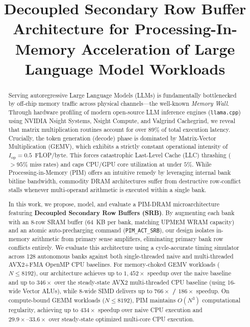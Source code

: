 \documentclass[conference]{IEEEtran}
\begin{document}
\title{Decoupled Secondary Row Buffer Architecture for Processing-In-Memory Acceleration of Large Language Model Workloads}

\author{
}

\maketitle

\begin{abstract}
Serving autoregressive Large Language Models (LLMs) is fundamentally bottlenecked by off-chip memory traffic across physical channels---the well-known \textit{Memory Wall}. Through hardware profiling of modern open-source LLM inference engines (\texttt{llama.cpp}) using NVIDIA Nsight Systems, Nsight Compute, and Valgrind Cachegrind, we reveal that matrix multiplication routines account for over $89\%$ of total execution latency. Crucially, the token generation (decode) phase is dominated by Matrix-Vector Multiplication (GEMV), which exhibits a strictly constant operational intensity of $I_{\text{op}} = 0.5$~FLOP/byte. This forces catastrophic Last-Level Cache (LLC) thrashing ($>95\%$ miss rates) and caps CPU/GPU core utilization at under $5\%$. While Processing-in-Memory (PIM) offers an intuitive remedy by leveraging internal bank bitline bandwidth, commodity DRAM architectures suffer from destructive row-conflict stalls whenever multi-operand arithmetic is executed within a single bank. 

In this work, we propose, model, and evaluate a PIM-DRAM microarchitecture featuring \textbf{Decoupled Secondary Row Buffers (SRB)}. By augmenting each bank with an 8-row SRAM buffer ($64$~KB per bank, matching UPMEM WRAM capacity) and an atomic auto-precharging command (\texttt{PIM\_ACT\_SRB}), our design isolates in-memory arithmetic from primary sense amplifiers, eliminating primary bank row conflicts entirely. We evaluate this architecture using a cycle-accurate timing simulator across 128 autonomous banks against both single-threaded naive and multi-threaded AVX2+FMA OpenMP CPU baselines. For memory-choked GEMV workloads ($N \le 8192$), our architecture achieves up to \textbf{$1,452\times$} speedup over the naive baseline and up to \textbf{$346\times$} over the steady-state AVX2 multi-threaded CPU baseline (using 16-wide Vector ALUs), while 8-wide SIMD delivers up to \textbf{$766\times$ / $186\times$} speedup. On compute-bound GEMM workloads ($N \le 8192$), PIM maintains $O(N^3)$ computational regularity, achieving up to \textbf{$434\times$} speedup over naive CPU execution and \textbf{$29.9\times\text{--}33.6\times$} over steady-state optimized multi-core CPU execution.
\end{abstract}
\end{document}
